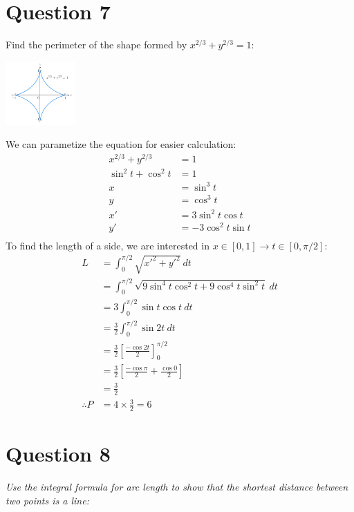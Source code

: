 \documentclass{article}
\begin{document}
\section*{Question 7}
Find the perimeter of the shape formed by $x^{2/3}+y^{2/3}=1$:
\begin{center}
    \includegraphics[width=0.2\textwidth]{A3Q7.jpg}
\end{center}
We can parametize the equation for easier calculation:
\begin{align*}
    x^{2/3}+y^{2/3}   & =1                \\
    \sin^2t + \cos^2t & = 1               \\
    x                 & =\sin^3 t         \\
    y                 & =\cos^3 t         \\
    x'                & =3\sin^2 t\cos t  \\
    y'                & =-3\cos^2 t\sin t \\
\end{align*}
To find the length of a side, we are interested in $x\in[0,1]\to t\in[0,\pi/2]$:
\begin{align*}
    L            & =\int_{0}^{\pi/2}\sqrt{x'^2+y'^2}\:d t                           \\
                 & =\int_{0}^{\pi/2}\sqrt{9\sin^4 t\cos^2 t+9\cos^4 t\sin^2 t}\:d t \\
                 & =3\int_{0}^{\pi/2}\sin t\cos t\:d t                              \\
                 & =\frac{3}{2}\int_{0}^{\pi/2}\sin 2t\:d t                         \\
                 & =\frac{3}{2}[\frac{-\cos 2t}{2}]_{0}^{\pi/2}                     \\
                 & =\frac{3}{2}[\frac{-\cos \pi}{2}+\frac{\cos 0}{2}]               \\
                 & =\frac{3}{2}                                                     \\
    \therefore P & = 4 \times \frac{3}{2} = 6
\end{align*}


\section*{Question 8}
\emph{Use the integral formula for arc length to show that the shortest distance between two points is a line:}
\end{document}
